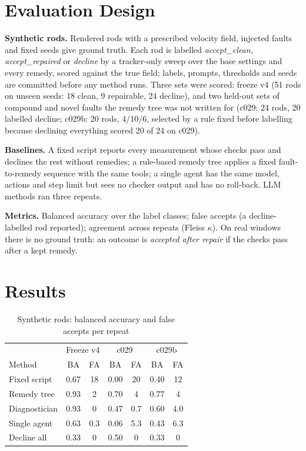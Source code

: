 \documentclass[conference]{IEEEtran}
\begin{document}
\section{Evaluation Design}
\textbf{Synthetic rods.} Rendered rods with a prescribed velocity field, injected faults and fixed seeds give ground truth. Each rod is labelled \emph{accept\_clean}, \emph{accept\_repaired} or \emph{decline} by a tracker-only sweep over the base settings and every remedy, scored against the true field; labels, prompts, thresholds and seeds are committed before any method runs. Three sets were scored: freeze v4 (51 rods on unseen seeds: 18 clean, 9 repairable, 24 decline), and two held-out sets of compound and novel faults the remedy tree was not written for (c029: 24 rods, 20 labelled decline; c029b: 20 rods, 4/10/6, selected by a rule fixed before labelling because declining everything scored 20 of 24 on c029).

\textbf{Baselines.} A fixed script reports every measurement whose checks pass and declines the rest without remedies; a rule-based remedy tree applies a fixed fault-to-remedy sequence with the same tools; a single agent has the same model, actions and step limit but sees no checker output and has no roll-back. LLM methods ran three repeats.

\textbf{Metrics.} Balanced accuracy over the label classes; false accepts (a decline-labelled rod reported); agreement across repeats (Fleiss $\kappa$). On real windows there is no ground truth: an outcome is \emph{accepted after repair} if the checks pass after a kept remedy.

\section{Results}
\begin{table}[t]
\caption{Synthetic rods: balanced accuracy and false accepts per repeat}
\label{tab:synth}
\centering
\setlength{\tabcolsep}{3.5pt}
\begin{tabular}{lcccccc}
\toprule
 & \multicolumn{2}{c}{Freeze v4} & \multicolumn{2}{c}{c029} & \multicolumn{2}{c}{c029b} \\
Method & BA & FA & BA & FA & BA & FA \\
\midrule
Fixed script & 0.67 & 18 & 0.00 & 20 & 0.40 & 12 \\
Remedy tree & 0.93 & 2 & 0.70 & 4 & 0.77 & 4 \\
Diagnostician & 0.93 & 0 & 0.47 & 0.7 & 0.60 & 4.0 \\
Single agent & 0.63 & 0.3 & 0.06 & 5.3 & 0.43 & 6.3 \\
Decline all & 0.33 & 0 & 0.50 & 0 & 0.33 & 0 \\
\bottomrule
\end{tabular}
\end{table}
\end{document}
